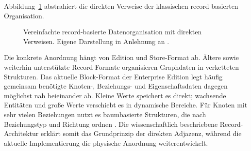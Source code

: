 Abbildung~\ref{fig:record-storage} abstrahiert die direkten Verweise der klassischen record-basierten Organisation.

\begin{figure}[htbp]
	\centering
	\caption{Vereinfachte record-basierte Datenorganisation mit direkten Verweisen. Eigene Darstellung in Anlehnung an \cite{besta2023demystifying,neo4j2026storeformats}.}
	\label{fig:record-storage}
\end{figure}

Die konkrete Anordnung hängt von Edition und Store-Format ab. Ältere sowie weiterhin unterstützte Record-Formate organisieren Graphdaten in verketteten Strukturen. Das aktuelle Block-Format der Enterprise Edition legt häufig gemeinsam benötigte Knoten-, Beziehungs- und Eigenschaftsdaten dagegen möglichst nah beieinander ab. Kleine Werte speichert es direkt; wachsende Entitäten und große Werte verschiebt es in dynamische Bereiche. Für Knoten mit sehr vielen Beziehungen nutzt es baumbasierte Strukturen, die nach Beziehungstyp und Richtung ordnen \cite{neo4j2026storeformats}. Die wissenschaftlich beschriebene Record-Architektur erklärt somit das Grundprinzip der direkten Adjazenz, während die aktuelle Implementierung die physische Anordnung weiterentwickelt.

